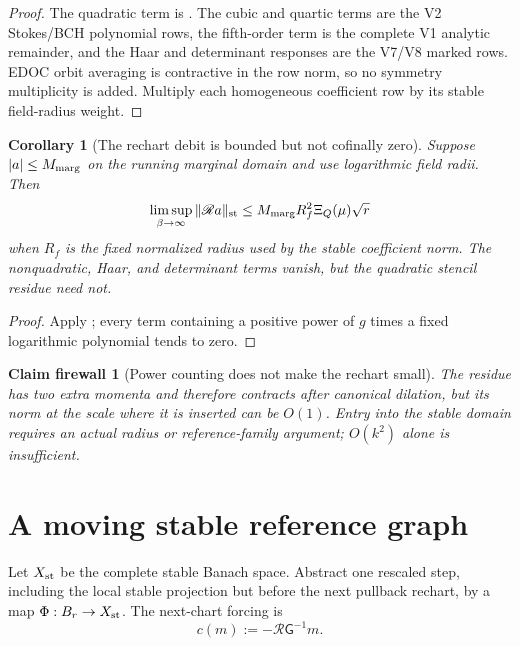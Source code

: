 \documentclass[11pt,oneside]{book}
\newtheorem{corollary}[theorem]{Corollary}
\newtheorem{firewall}[theorem]{Claim firewall}
\theoremstyle{definition}
\theoremstyle{remark}
\begin{document}
\begin{proof}
The quadratic term is
.  The cubic and quartic terms are the
V2 Stokes/BCH polynomial rows, the fifth-order term is the complete
V1 analytic remainder, and the Haar and determinant responses are
the V7/V8 marked rows.  EDOC orbit averaging is contractive in the
row norm, so no symmetry multiplicity is added.  Multiply each
homogeneous coefficient row by its stable field-radius weight.
\end{proof}

\begin{corollary}[The rechart debit is bounded but not cofinally zero]
\label{cor:e8v10-rechart-limit}
Suppose \(|a|\le M_{\rm marg}\) on the running marginal domain and
use logarithmic field radii.  Then
\[
 \limsup_{\beta\to\infty}\|{\mathscr R}a\|_{\rm st}
 \le
 M_{\rm marg}R_f^2\Xi_Q(\mu)\sqrt r                \label{eq:e8v10-rechart-limit}
\]
when \(R_f\) is the fixed normalized radius used by the stable
coefficient norm.  The nonquadratic, Haar, and determinant terms
vanish, but the quadratic stencil residue need not.
\end{corollary}

\begin{proof}
Apply ; every term containing a
positive power of \(g\) times a fixed logarithmic polynomial tends to
zero.
\end{proof}

\begin{firewall}[Power counting does not make the rechart small]
\label{fire:e8v10-rechart-small}
The residue has two extra momenta and therefore contracts after
canonical dilation, but its norm at the scale where it is inserted
can be \(O(1)\).  Entry into the stable domain requires an actual
radius or reference-family argument; \(O(k^2)\) alone is insufficient.
\end{firewall}

\section{A moving stable reference graph}
\label{sec:e8v10-reference-graph}

Let \(X_{\rm st}\) be the complete stable Banach space.  Abstract one
rescaled step, including the local stable projection but before the
next pullback rechart, by a map
\(\Phi:B_r\to X_{\rm st}\).  The next-chart forcing is
\[
 c(m):=-{\mathscr R}{\mathsf G}^{-1}m.              \label{eq:e8v10-cm}
\]
\end{document}
